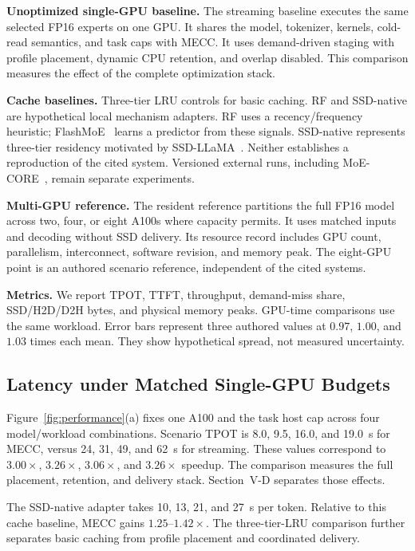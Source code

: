 \documentclass[conference,9pt,letterpaper]{IEEEtran}
\newcommand{\mecc}{\textsc{MECC}}
\begin{document}
\textbf{Unoptimized single-GPU baseline.} The streaming baseline executes the same selected FP16 experts on one GPU. It shares the model, tokenizer, kernels, cold-read semantics, and task caps with \mecc{}. It uses demand-driven staging with profile placement, dynamic CPU retention, and overlap disabled. This comparison measures the effect of the complete optimization stack.

\textbf{Cache baselines.} Three-tier LRU controls for basic caching. RF and SSD-native are hypothetical local mechanism adapters. RF uses a recency/frequency heuristic; FlashMoE~\cite{flashmoe} learns a predictor from these signals. SSD-native represents three-tier residency motivated by SSD-LLaMA~\cite{ssdllama}. Neither establishes a reproduction of the cited system. Versioned external runs, including MoE-CORE~\cite{core}, remain separate experiments.

\textbf{Multi-GPU reference.} The resident reference partitions the full FP16 model across two, four, or eight A100s where capacity permits. It uses matched inputs and decoding without SSD delivery. Its resource record includes GPU count, parallelism, interconnect, software revision, and memory peak. The eight-GPU point is an authored scenario reference, independent of the cited systems.

\textbf{Metrics.} We report TPOT, TTFT, throughput, demand-miss share, SSD/H2D/D2H bytes, and physical memory peaks. GPU-time comparisons use the same workload. Error bars represent three authored values at $0.97$, $1.00$, and $1.03$ times each mean. They show hypothetical spread, not measured uncertainty.

\subsection{Latency under Matched Single-GPU Budgets}
Figure~\ref{fig:performance}(a) fixes one A100 and the task host cap across four model/workload combinations. Scenario TPOT is 8.0, 9.5, 16.0, and 19.0~s for \mecc{}, versus 24, 31, 49, and 62~s for streaming. These values correspond to $3.00\times$, $3.26\times$, $3.06\times$, and $3.26\times$ speedup. The comparison measures the full placement, retention, and delivery stack. Section~V-D separates those effects.

The SSD-native adapter takes 10, 13, 21, and 27~s per token. Relative to this cache baseline, \mecc{} gains $1.25$--$1.42\times$. The three-tier-LRU comparison further separates basic caching from profile placement and coordinated delivery.
\end{document}
